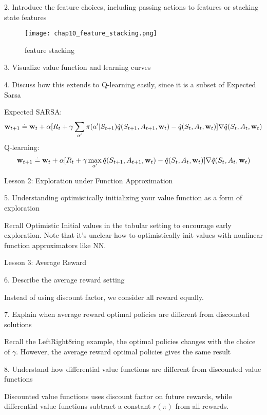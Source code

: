 \documentclass[sutton_barto_notes.tex]{subfiles}
\begin{document}
2. Introduce the feature choices, including passing actions to features or stacking state features 

\begin{figure}[h!]
  \texttt{[image: chap10\_feature\_stacking.png]}
  \caption{feature stacking}
  \label{fig:feature-stacking}
\end{figure}

3. Visualize value function and learning curves 

4. Discuss how this extends to Q-learning easily, since it is a subset of Expected Sarsa 

Expected SARSA:
$${\operatorname*{\mathbf{w}}}_{t+1} \doteq {\operatorname*{\mathbf{w}}}_t + \alpha[R_{t} + \gamma\sum_{a'}\pi(a'|S_{t+1})\hat{q}(S_{t+1}, A_{t+1}, {\operatorname*{\mathbf{w}}}_t) - \hat{q}(S_t, A_t, {\operatorname*{\mathbf{w}}}_t)]\nabla\hat{q}(S_t, A_t, {\operatorname*{\mathbf{w}}}_t)$$
Q-learning:
$${\operatorname*{\mathbf{w}}}_{t+1} \doteq {\operatorname*{\mathbf{w}}}_t + \alpha[R_{t} + \gamma \max_{a'}\hat{q}(S_{t+1}, A_{t+1}, {\operatorname*{\mathbf{w}}}_t) - \hat{q}(S_t, A_t, {\operatorname*{\mathbf{w}}}_t)]\nabla\hat{q}(S_t, A_t, {\operatorname*{\mathbf{w}}}_t)$$

Lesson 2: Exploration under Function Approximation 

5. Understanding optimistically initializing your value function as a form of exploration

Recall Optimistic Initial values in the tabular setting to encourage early exploration. Note that it's unclear how to optimistically init values with nonlinear function approximators like NN.

Lesson 3: Average Reward 

6. Describe the average reward setting 

Instead of using discount factor, we consider all reward equally.

7. Explain when average reward optimal policies are different from discounted solutions 

Recall the LeftRight8ring example, the optimal policies changes with the choice of $\gamma$. However, the average reward optimal policies gives the same result

8. Understand how differential value functions are different from discounted value functions

Discounted value functions uses discount factor on future rewards, while differential value functions subtract a constant $r(\pi)$ from all rewards.
\end{document}

